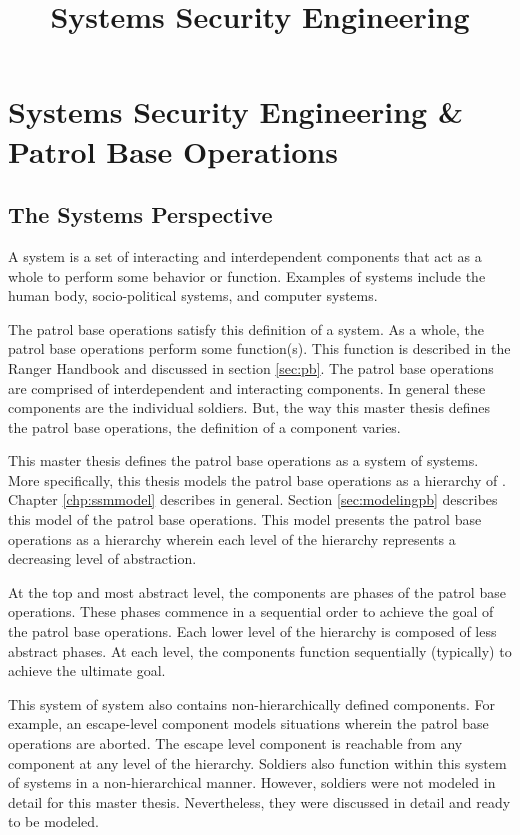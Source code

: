 \documentclass[../../main/main.tex]{subfiles}
\begin{document}
\title{Systems Security Engineering}


\chapter{Systems Security Engineering \& Patrol Base Operations}\label{chp:sse}


\section{The Systems Perspective}\label{sec:systems}
A system is a set of interacting and interdependent components that act as a whole to perform some behavior or function.  Examples of systems include the human body, socio-political systems, and computer systems. 

The patrol base operations satisfy this definition of a system.  As a whole, the patrol base operations perform some function(s).  This function is described in the Ranger Handbook \cite{rangermanual} and discussed in section \ref{sec:pb}.  The patrol base operations are comprised of interdependent and interacting components.  In general these components are the individual soldiers.  But, the way this master thesis defines the patrol base operations, the definition of a component varies.

This master thesis defines the patrol base operations as a system of systems.  More specifically, this thesis models the patrol base operations as a hierarchy of .  Chapter \ref{chp:ssmmodel} describes  in general.   Section \ref{sec:modelingpb} describes this model of the patrol base operations.  This model presents the patrol base operations as a hierarchy wherein each level of the hierarchy represents a decreasing level of abstraction.   

At the top and most abstract level, the components are phases of the patrol base operations.  These phases commence in a sequential order to achieve the goal of the patrol base operations.  Each lower level of the hierarchy is composed of less abstract phases. At each level, the components function sequentially (typically) to achieve the ultimate goal.  

This system of system also contains non-hierarchically defined components.  For example, an escape-level component models situations wherein the patrol base operations are aborted.  The escape level component is reachable from any component at any level of the hierarchy.  Soldiers also function within this system of systems in a non-hierarchical manner.  However, soldiers were not modeled in detail for this master thesis.  Nevertheless, they were discussed in detail and ready to be modeled.
\end{document}
